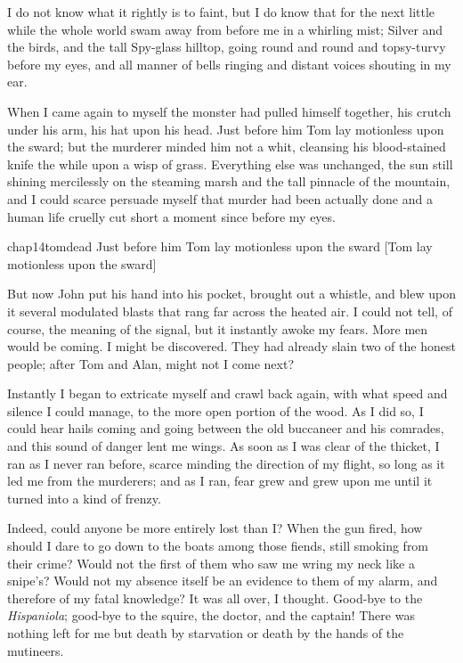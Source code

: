 I do not know what it rightly is to faint, but I do know that for the next little while the whole world swam away from before me in a whirling mist; Silver and the birds, and the tall Spy-glass hilltop, going round and round and topsy-turvy before my eyes, and all manner of bells ringing and distant voices shouting in my ear.

When I came again to myself the monster had pulled himself together, his crutch under his arm, his hat upon his head. Just before him Tom lay motionless upon the sward; but the murderer minded him not a whit, cleansing his blood-stained knife the while upon a wisp of grass. Everything else was unchanged, the sun still shining mercilessly on the steaming marsh and the tall pinnacle of the mountain, and I could scarce persuade myself that murder had been actually done and a human life cruelly cut short a moment since before my eyes.


\begin{colorbigpic}
	[\picsize]
	{chap14tomdead}
	{Just before him Tom lay motionless upon the sward}
	[Tom lay motionless upon the sward]
\end{colorbigpic}

But now John put his hand into his pocket, brought out a whistle, and blew upon it several modulated blasts that rang far across the heated air. I could not tell, of course, the meaning of the signal, but it instantly awoke my fears. More men would be coming. I might be discovered. They had already slain two of the honest people; after Tom and Alan, might not I come next?

Instantly I began to extricate myself and crawl back again, with what speed and silence I could manage, to the more open portion of the wood. As I did so, I could hear hails coming and going between the old buccaneer and his comrades, and this sound of danger lent me wings. As soon as I was clear of the thicket, I ran as I never ran before, scarce minding the direction of my flight, so long as it led me from the murderers; and as I ran, fear grew and grew upon me until it turned into a kind of frenzy.

Indeed, could anyone be more entirely lost than I? When the gun fired, how should I dare to go down to the boats among those fiends, still smoking from their crime? Would not the first of them who saw me wring my neck like a snipe's? Would not my absence itself be an evidence to them of my alarm, and therefore of my fatal knowledge? It was all over, I thought. Good-bye to the \textit{Hispaniola}; good-bye to the squire, the doctor, and the captain! There was nothing left for me but death by starvation or death by the hands of the mutineers.

